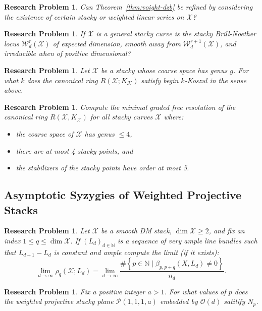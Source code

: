 \documentclass[11pt,reqno]{amsart}
\newtheorem{problem}[lemma]{Research Problem}
\theoremstyle{remark}
\newcommand{\NN}{\mathbb{N}}
\newcommand{\cK}{\mathcal{K}}
\newcommand{\cO}{\mathcal{O}}
\newcommand{\cP}{\mathcal{P}}
\newcommand{\cW}{\mathcal{W}}
\newcommand{\cX}{\mathcal{X}}
\begin{document}
\begin{problem}
	Can Theorem~\ref{thm:voight-dzb} be refined  by considering the existence of certain stacky  or weighted linear series on $\cX$?
\end{problem}

\begin{problem}
	If $\cX$ is a general stacky curve is the stacky Brill-Noether locus $\cW_{d}^{r}(\cX)$ of expected dimension, smooth away from $\cW_{d}^{r+1}(\cX)$, and irreducible when of positive dimensional?
\end{problem}


\begin{problem}
	Let $\cX$ be a stacky whose coarse space has genus $g$. For what $k$ does the canonical ring $R(\cX;K_{\cK})$ satisfy begin $k$-Koszul in the sense above.
\end{problem}

\begin{problem}\label{prob:comp-canonical-stacky}
	Compute the minimal graded free resolution of the canonical ring $R(\cX, K_{\cX})$ for all stacky curves $\cX$ where:
	\begin{itemize}
		\item the coarse space of $\cX$ has genus $\leq 4$,
		\item there are at most 4 stacky points, and
		\item the stabilizers of the stacky points have order at most 5.
	\end{itemize}
\end{problem}

\subsection{Asymptotic Syzygies of Weighted Projective Stacks}

\begin{problem}
Let $\cX$ be a smooth DM stack, $\dim \cX \geq2$, and fix an index $1\leq q \leq \dim \cX$. If $(L_{d})_{d\in\NN}$ is a sequence of very ample line bundles such that $L_{d+1}-L_{d}$ is constant and ample compute the limit (if it exists):
\[
\lim_{d\to\infty} \rho_{q}\left(\cX; L_d\right) = \lim_{d\to\infty} \frac{\#\left\{p\in\NN \; \big| \; \beta_{p,p+q}\left(X,L_{d}\right)\neq0\right\}}{n_{d}}.
\]
\end{problem}

\begin{problem}
	Fix a positive integer $a>1$. For what values of $p$ does the weighted projective stacky plane $\cP(1,1,1,a)$ embedded by $\cO(d)$ satitify $N_{p}$. 
\end{problem}
\end{document}
